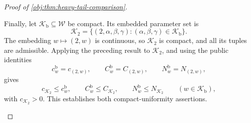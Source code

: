 \documentclass[11pt]{article}
\begin{document}
\begin{proof}[Proof of \cref{obj:thm:heavy-tail-comparison}]
\begin{enumerate}
Finally, let \(\mathcal K_{\mathrm b}\subseteq\mathcal W\) be compact. Its embedded parameter set is
\[
\mathcal K_2
=\{(2,\alpha,\beta,\gamma):
(\alpha,\beta,\gamma)\in\mathcal K_{\mathrm b}\}.
\]
The embedding \(w\mapsto(2,w)\) is continuous, so \(\mathcal K_2\) is compact, and all its tuples are admissible. Applying the preceding result to \(\mathcal K_2\), and using the public identities
\[
c_w^{\mathrm b}=c_{(2,w)},
\qquad
C_w^{\mathrm b}=C_{(2,w)},
\qquad
N_w^{\mathrm b}=N_{(2,w)},
\]
gives
\[
c_{\mathcal K_2}\le c_w^{\mathrm b},
\qquad
C_w^{\mathrm b}\le C_{\mathcal K_2},
\qquad
N_w^{\mathrm b}\le N_{\mathcal K_2}
\qquad(w\in\mathcal K_{\mathrm b}),
\]
with \(c_{\mathcal K_2}>0\). This establishes both compact-uniformity assertions.
\end{enumerate}
\end{proof}
\end{document}
